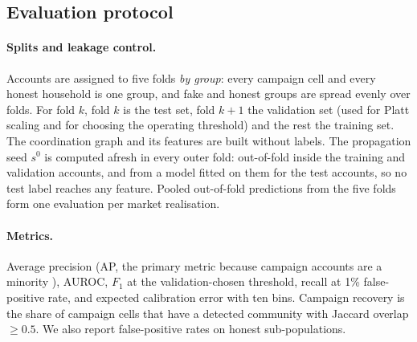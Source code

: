 \documentclass[pdflatex,sn-basic]{sn-jnl}
\theoremstyle{thmstyleone}
\theoremstyle{thmstylethree}
\begin{document}
\subsection{Evaluation protocol}
\paragraph{Splits and leakage control.} Accounts are assigned to five folds \emph{by group}: every campaign cell and every honest household is one group, and fake and honest groups are spread evenly over folds. For fold $k$, fold $k$ is the test set, fold $k+1$ the validation set (used for Platt scaling and for choosing the operating threshold) and the rest the training set. The coordination graph and its features are built without labels. The propagation seed $s^0$ is computed afresh in every outer fold: out-of-fold inside the training and validation accounts, and from a model fitted on them for the test accounts, so no test label reaches any feature. Pooled out-of-fold predictions from the five folds form one evaluation per market realisation.

\paragraph{Metrics.} Average precision (AP, the primary metric because campaign accounts are a minority \citep{saito2015}), AUROC, $F_1$ at the validation-chosen threshold, recall at 1\% false-positive rate, and expected calibration error \citep{guo2017,niculescu2005} with ten bins. Campaign recovery is the share of campaign cells that have a detected community with Jaccard overlap $\ge0.5$. We also report false-positive rates on honest sub-populations.
\end{document}
